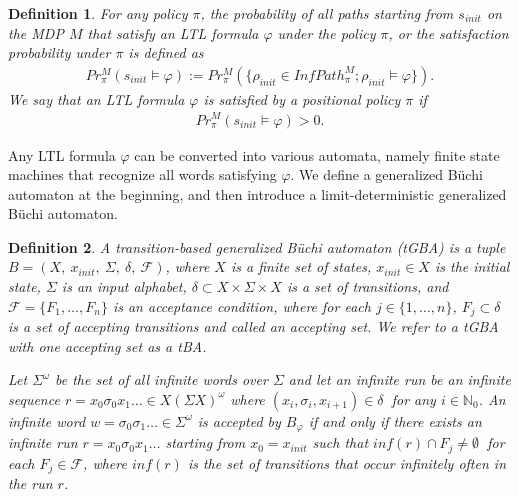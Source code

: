 \documentclass[letterpaper, 10 pt, conference]{ieeeconf}  %
\newtheorem{definition}{Definition}
\begin{document}
\begin{definition}
For any policy $\pi$, the probability of all paths starting from $s_{init}$ on the MDP $M$ that satisfy an LTL formula $\varphi$ under the policy $\pi$, or the satisfaction probability under $\pi$ is defined as
\begin{align*}
Pr^{M}_{\pi}(s_{init} \! \models \varphi) := Pr^{M}_{\pi}(\{ \rho_{init} \! \in \! InfPath^{M}_{\pi} ; \rho_{init} \! \models \varphi \}).
\end{align*}
We say that an LTL formula $\varphi$ is satisfied by a positional policy $\pi$ if
\begin{align*}
Pr^{M}_{\pi}(s_{init} \models \varphi) > 0.
\end{align*}

\label{def5}
\end{definition}

Any LTL formula $\varphi$ can be converted into various automata, namely finite state machines that recognize %
all words satisfying $\varphi$.
 We define a generalized B\"{u}chi automaton at the beginning, and then introduce a limit-deterministic generalized B\"{u}chi automaton.

\begin{definition}
  A transition-based generalized B\"{u}chi automaton (tGBA) is a tuple $B = (X,\ x_{init},\ \Sigma,\ \delta,\ \mathcal{F})$, where $X$ is a finite set of states, $x_{init} \in X$ is the initial state, $\Sigma$ is an input alphabet, $\delta \subset  X\times \Sigma \times X$ is a set of transitions, and $\mathcal{F} = \{F_1,\ldots,F_n\}$ is an acceptance condition, where for each $ j \in \{1,\ldots,n\}$, $F_j \subset \delta$ is a set of accepting transitions and called an accepting set. We refer to a tGBA with one accepting set as a tBA.

  Let $\Sigma^{\omega}$ be the set of all infinite words over $\Sigma$ and let an infinite run be an infinite sequence $r = x_0\sigma_0x_1 \ldots \in X (\Sigma X)^{\omega}$ where $(x_i, \sigma_{i}, x_{i+1}) \in \delta\ $ for any $ i\in \mathbb{N}_0$. An infinite word $w = \sigma_0\sigma_1 \ldots \in \Sigma^{\omega}$ is accepted by $B_{\varphi}$ if and only if there exists an infinite run $r = x_0 \sigma_0 x_1 \ldots$ starting from $x_0 = x_{init}$ such that $inf(r) \cap F_j \neq \emptyset\ $ for each $F_j \in \mathcal{F}$, where $inf(r)$ is the set of transitions that occur infinitely often in the run $r$.
\end{definition}
\end{document}
